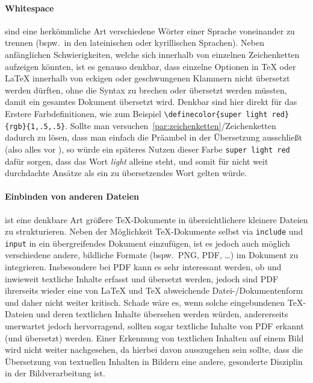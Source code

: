 \paragraph*{Whitespace\label{par:zeichenketten}} sind eine herkömmliche Art verschiedene Wörter einer Sprache voneinander zu trennen (bspw.\ in den lateinischen oder kyrillischen Sprachen). Neben anfänglichen Schwierigkeiten, welche sich innerhalb von einzelnen Zeichenketten aufzeigen könnten, ist es genauso denkbar, dass einzelne Optionen in \TeX{} oder \LaTeX{} innerhalb von eckigen oder geschwungenen Klammern nicht übersetzt werden dürften, ohne die Syntax zu brechen oder übersetzt werden müssten, damit ein gesamtes Dokument übersetzt wird. Denkbar sind hier direkt für das Erstere Farbdefinitionen, wie zum Beispiel \verb|\definecolor{super light red}{rgb}{1,.5,.5}|. Sollte man versuchen~\ref{par:zeichenketten}/Zeichenketten dadurch zu lösen, dass man einfach die Präambel in der Übersetzung ausschließt (also alles vor \verb||), so würde ein späteres Nutzen dieser Farbe \texttt{super light red} dafür sorgen, dass das Wort \textit{light} alleine steht, und somit für nicht weit durchdachte Ansätze als ein zu übersetzendes Wort gelten würde. 

\paragraph*{Einbinden von anderen Dateien\label{par:anderedateien}} ist eine denkbare Art größere \TeX{}-Dokumente in übersichtlichere kleinere Dateien zu strukturieren. Neben der Möglichkeit \TeX{}-Dokumente selbst via \texttt{include} und \texttt{input} in ein übergreifendes Dokument einzufügen, ist es jedoch auch möglich verschiedene andere, bildliche Formate (bspw.\ PNG, PDF, \ldots) im Dokument zu integrieren. Insbesondere bei PDF kann es sehr interessant werden, ob und inwieweit textliche Inhalte erfasst und übersetzt werden, jedoch sind PDF ihrerseits wieder eine von \LaTeX{} und \TeX{} abweichende Datei-/Dokumentenform und daher nicht weiter kritisch. Schade wäre es, wenn solche eingebundenen \TeX{}-Dateien und deren textlichen Inhalte übersehen werden würden, andererseits unerwartet jedoch hervorragend, sollten sogar textliche Inhalte von PDF erkannt (und übersetzt) werden. Einer Erkennung von textlichen Inhalten auf einem Bild wird nicht weiter nachgesehen, da hierbei davon ausszugehen sein sollte, dass die Übersetzung von textuellen Inhalten in Bildern eine andere, gesonderte Disziplin in der Bildverarbeitung ist.%

